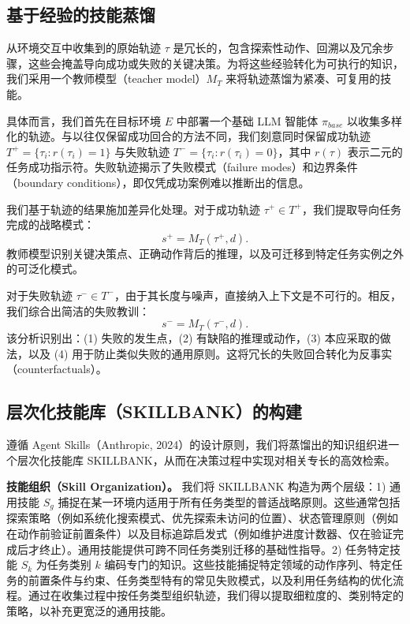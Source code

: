 \documentclass[11pt,UTF8,fontset=fandol]{ctexart}
\begin{document}
\subsection{基于经验的技能蒸馏}

从环境交互中收集到的原始轨迹 $\tau$ 是冗长的，包含探索性动作、回溯以及冗余步骤，这些会掩盖导向成功或失败的关键决策。为将这些经验转化为可执行的知识，我们采用一个教师模型（teacher model）$M_T$ 来将轨迹蒸馏为紧凑、可复用的技能。

具体而言，我们首先在目标环境 $E$ 中部署一个基础 LLM 智能体 $\pi_{base}$ 以收集多样化的轨迹。与以往仅保留成功回合的方法不同，我们刻意同时保留成功轨迹 $T^+ = \{\tau_i : r(\tau_i) = 1\}$ 与失败轨迹 $T^- = \{\tau_i : r(\tau_i) = 0\}$，其中 $r(\tau)$ 表示二元的任务成功指示符。失败轨迹揭示了失败模式（failure modes）和边界条件（boundary conditions），即仅凭成功案例难以推断出的信息。

我们基于轨迹的结果施加差异化处理。对于成功轨迹 $\tau^+ \in T^+$，我们提取导向任务完成的战略模式：
\begin{equation}
s^+ = M_T(\tau^+, d).
\end{equation}
教师模型识别关键决策点、正确动作背后的推理，以及可迁移到特定任务实例之外的可泛化模式。

对于失败轨迹 $\tau^- \in T^-$，由于其长度与噪声，直接纳入上下文是不可行的。相反，我们综合出简洁的失败教训：
\begin{equation}
s^- = M_T(\tau^-, d).
\end{equation}
该分析识别出：(1) 失败的发生点，(2) 有缺陷的推理或动作，(3) 本应采取的做法，以及 (4) 用于防止类似失败的通用原则。这将冗长的失败回合转化为反事实（counterfactuals）。

\subsection{层次化技能库（SKILLBANK）的构建}

遵循 Agent Skills（Anthropic, 2024）的设计原则，我们将蒸馏出的知识组织进一个层次化技能库 SKILLBANK，从而在决策过程中实现对相关专长的高效检索。

\textbf{技能组织（Skill Organization）。} 我们将 SKILLBANK 构造为两个层级：1) 通用技能 $S_g$ 捕捉在某一环境内适用于所有任务类型的普适战略原则。这些通常包括探索策略（例如系统化搜索模式、优先探索未访问的位置）、状态管理原则（例如在动作前验证前置条件）以及目标追踪启发式（例如维护进度计数器、仅在验证完成后才终止）。通用技能提供可跨不同任务类别迁移的基础性指导。2) 任务特定技能 $S_k$ 为任务类别 $k$ 编码专门的知识。这些技能捕捉特定领域的动作序列、特定任务的前置条件与约束、任务类型特有的常见失败模式，以及利用任务结构的优化流程。通过在收集过程中按任务类型组织轨迹，我们得以提取细粒度的、类别特定的策略，以补充更宽泛的通用技能。
\end{document}

